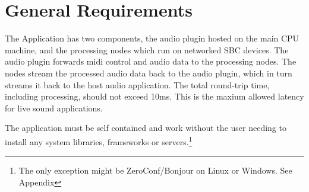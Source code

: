 \section{General Requirements}

The Application has two components, the audio plugin hosted on the main CPU machine, and the processing nodes which run on networked SBC devices. The audio plugin forwards midi control and audio data to the processing nodes. The nodes stream the processed audio data back to the audio plugin, which in turn streams it back to the host audio application. The total round-trip time, including processing, should not exceed 10ms. This is the maxium allowed latency for live sound applications. \cite{AES67-2013}

The application must be self contained and work without the user needing to install any system libraries, frameworks or servers.\footnote{The only exception might be ZeroConf/Bonjour on Linux or Windows. See Appendix}
